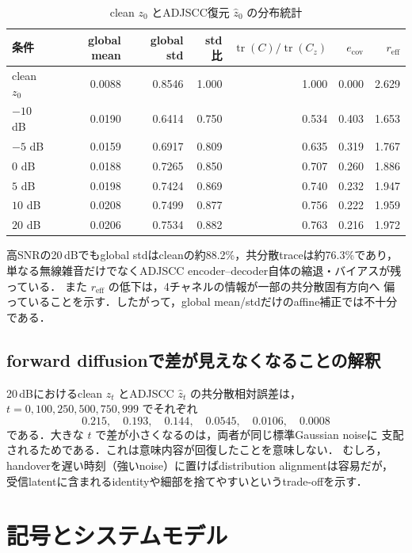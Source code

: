\documentclass[11pt,a4paper]{ltjsarticle}
\newcommand{\tr}{\operatorname{tr}}
\begin{document}
\begin{table}[htbp]
  \centering
  \small
  \caption{clean \(z_0\) とADJSCC復元 \(\hat z_0\) の分布統計}
  \label{tab:latent-stat}
  \begin{tabular}{lrrrrrr}
    \toprule
    条件 & global mean & global std & std比
         & \(\tr(C)/\tr(C_z)\) & \(e_{\mathrm{cov}}\) & \(r_{\mathrm{eff}}\) \\
    \midrule
    clean \(z_0\) & 0.0088 & 0.8546 & 1.000 & 1.000 & 0.000 & 2.629 \\
    \(-10\) dB & 0.0190 & 0.6414 & 0.750 & 0.534 & 0.403 & 1.653 \\
    \(-5\) dB  & 0.0159 & 0.6917 & 0.809 & 0.635 & 0.319 & 1.767 \\
    \(0\) dB   & 0.0188 & 0.7265 & 0.850 & 0.707 & 0.260 & 1.886 \\
    \(5\) dB   & 0.0198 & 0.7424 & 0.869 & 0.740 & 0.232 & 1.947 \\
    \(10\) dB  & 0.0208 & 0.7499 & 0.877 & 0.756 & 0.222 & 1.959 \\
    \(20\) dB  & 0.0206 & 0.7534 & 0.882 & 0.763 & 0.216 & 1.972 \\
    \bottomrule
  \end{tabular}
\end{table}

高SNRの20\,dBでもglobal stdはcleanの約88.2\%，共分散traceは約76.3\%であり，
単なる無線雑音だけでなくADJSCC encoder--decoder自体の縮退・バイアスが残っている．
また \(r_{\mathrm{eff}}\) の低下は，4チャネルの情報が一部の共分散固有方向へ
偏っていることを示す．したがって，global mean/stdだけのaffine補正では不十分である．

\subsection{forward diffusionで差が見えなくなることの解釈}

20\,dBにおけるclean \(z_t\) とADJSCC \(\hat z_t\) の共分散相対誤差は，
\(t=0,100,250,500,750,999\) でそれぞれ
\[
  0.215,\quad 0.193,\quad 0.144,\quad
  0.0545,\quad 0.0106,\quad 0.0008
\]
である．大きな \(t\) で差が小さくなるのは，両者が同じ標準Gaussian noiseに
支配されるためである．これは意味内容が回復したことを意味しない．
むしろ，handoverを遅い時刻（強いnoise）に置けばdistribution alignmentは容易だが，
受信latentに含まれるidentityや細部を捨てやすいというtrade-offを示す．

\section{記号とシステムモデル}
\end{document}
